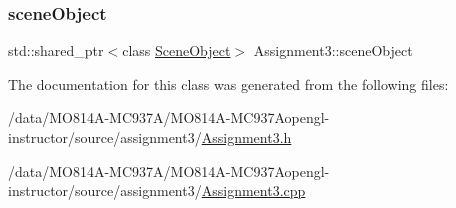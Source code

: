 \hypertarget{class_assignment3_a0bc175d3efff30c5f4aa3ffa1272338a}{}\label{class_assignment3_a0bc175d3efff30c5f4aa3ffa1272338a}
\subsubsection{\texorpdfstring{scene\+Object}{sceneObject}}
{\footnotesize\ttfamily std\+::shared\+\_\+ptr$<$class \hyperlink{class_scene_object}{Scene\+Object}$>$ Assignment3\+::scene\+Object\hspace{0.3cm}{\ttfamily [private]}}



The documentation for this class was generated from the following files\+:\begin{DoxyCompactItemize}
\item
/data/MO814A-MC937A/MO814A-MC937Aopengl-\/instructor/source/assignment3/\hyperlink{_assignment3_8h}{Assignment3.\+h}\item
/data/MO814A-MC937A/MO814A-MC937Aopengl-\/instructor/source/assignment3/\hyperlink{_assignment3_8cpp}{Assignment3.\+cpp}\end{DoxyCompactItemize}
